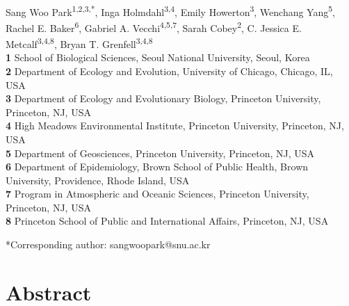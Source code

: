 \documentclass[12pt]{article}
\date{\today}
\begin{document}
\begin{flushleft}{
	\Large
	\textbf{}
}
\newline
\\
Sang Woo Park\textsuperscript{1,2,3,*}, Inga Holmdahl\textsuperscript{3,4}, Emily Howerton\textsuperscript{3}, Wenchang Yang\textsuperscript{5}, Rachel E. Baker\textsuperscript{6}, Gabriel A. Vecchi\textsuperscript{4,5,7}, Sarah Cobey\textsuperscript{2}, C. Jessica E. Metcalf\textsuperscript{3,4,8}, Bryan T. Grenfell\textsuperscript{3,4,8}
\\
\bigskip
\textbf{1} School of Biological Sciences, Seoul National University, Seoul, Korea
\\
\textbf{2} Department of Ecology and Evolution, University of Chicago, Chicago, IL, USA
\\
\textbf{3} Department of Ecology and Evolutionary Biology, Princeton University, Princeton, NJ, USA
\\
\textbf{4} High Meadows Environmental Institute, Princeton University, Princeton, NJ, USA
\\
\textbf{5} Department of Geosciences, Princeton University, Princeton, NJ, USA
\\
\textbf{6} Department of Epidemiology, Brown School of Public Health, Brown University, Providence, Rhode Island, USA
\\
\textbf{7} Program in Atmospheric and Oceanic Sciences, Princeton University, Princeton, NJ, USA
\\
\textbf{8} Princeton School of Public and International Affairs, Princeton, NJ, USA
\bigskip

*Corresponding author: sangwoopark@snu.ac.kr
\end{flushleft}

\section*{Abstract}
\end{document}
